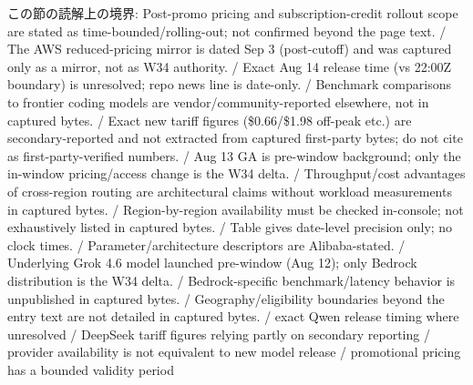 \begin{claimboundary}[読解上の境界]
この節の読解上の境界: Post-promo pricing and subscription-credit rollout scope are stated as time-bounded/rolling-out; not confirmed beyond the page text. / The AWS reduced-pricing mirror is dated Sep 3 (post-cutoff) and was captured only as a mirror, not as W34 authority. / Exact Aug 14 release time (vs 22:00Z boundary) is unresolved; repo news line is date-only. / Benchmark comparisons to frontier coding models are vendor/community-reported elsewhere, not in captured bytes. / Exact new tariff figures (\$0.66/\$1.98 off-peak etc.) are secondary-reported and not extracted from captured first-party bytes; do not cite as first-party-verified numbers. / Aug 13 GA is pre-window background; only the in-window pricing/access change is the W34 delta. / Throughput/cost advantages of cross-region routing are architectural claims without workload measurements in captured bytes. / Region-by-region availability must be checked in-console; not exhaustively listed in captured bytes. / Table gives date-level precision only; no clock times. / Parameter/architecture descriptors are Alibaba-stated. / Underlying Grok 4.6 model launched pre-window (Aug 12); only Bedrock distribution is the W34 delta. / Bedrock-specific benchmark/latency behavior is unpublished in captured bytes. / Geography/eligibility boundaries beyond the entry text are not detailed in captured bytes. / exact Qwen release timing where unresolved / DeepSeek tariff figures relying partly on secondary reporting / provider availability is not equivalent to new model release / promotional pricing has a bounded validity period
\end{claimboundary}
